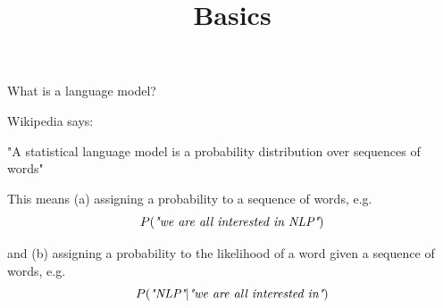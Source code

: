 


\newcommand*\POS[1]{\textsubscript{\texttt{#1}}} %
\usepackage{qtree} %

\newcommand{\titlefigure}{figure/bengio03.png}
\newcommand{\learninggoals}{
\item grasp importance of the ``look-up table`` a.k.a. embedding layer
\item understand computational implications of language modeling}

\title{Basics}
\date{}





\begin{frame}{What is a language model?}
\vspace{.5cm}
\begin{block}{Wikipedia says:}
    \begin{center}
    "A statistical language model is a probability distribution over sequences of words"
    \end{center}
\end{block}
\begin{block}{This means (a) assigning a probability to a sequence of words, e.g.}
    \[
    P(\mbox{\it "we are all interested in NLP"})
    \]
\end{block}
\begin{block}{and (b) assigning a probability to the likelihood of a word given a sequence of words, e.g.}
    \[
    P(\mbox{\it "NLP"} | \mbox{\it "we are all interested in"})
    \]
\end{block}
\end{frame}


